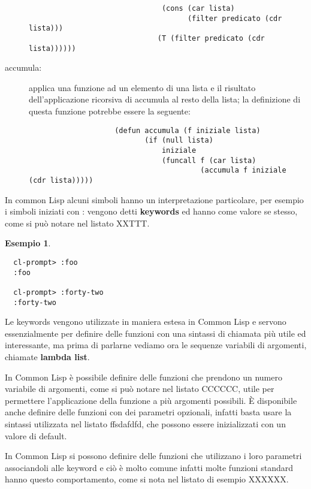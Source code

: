 \documentclass[a4paper]{book}
\newtheorem*{esempio}{Esempio}
\begin{document}
\begin{description}
\begin{verbatim}
                               (cons (car lista)
                                     (filter predicato (cdr lista)))
                              (T (filter predicato (cdr lista))))))
                 \end{verbatim}
  \item [accumula:] applica una funzione ad un elemento di una lista e il risultato
                    dell'applicazione ricorsiva di accumula al resto della lista;
                    la definizione di questa funzione potrebbe essere la seguente:
                    \begin{verbatim}
                    (defun accumula (f iniziale lista)
                           (if (null lista)
                               iniziale
                               (funcall f (car lista)
                                        (accumula f iniziale (cdr lista)))))
                    \end{verbatim}
\end{description}
In common Lisp alcuni simboli hanno un interpretazione particolare, per esempio
i simboli iniziati con : vengono detti \textbf{keywords} ed hanno come valore se stesso,
come si può notare nel listato XXTTT.
\begin{esempio}
  \begin{verbatim}
  cl-prompt> :foo
  :foo

  cl-prompt> :forty-two
  :forty-two
\end{verbatim}
\end{esempio}
Le keywords vengono utilizzate in maniera estesa in Common Lisp e servono essenzialmente
per definire delle funzioni con una sintassi di chiamata più utile ed interessante,
ma prima di parlarne vediamo ora le sequenze variabili di argomenti, chiamate \textbf{lambda list}.

In Common Lisp è possibile definire delle funzioni che prendono un numero variabile di argomenti,
come si può notare nel listato CCCCCC, utile per permettere l'applicazione della funzione
a più argomenti possibili.\newline
È disponibile anche definire delle funzioni con dei parametri opzionali, infatti basta
usare la sintassi utilizzata nel listato ffsdafdfd, che possono essere inizializzati
con un valore di default.

In Common Lisp si possono definire delle funzioni che utilizzano i loro parametri
associandoli alle keyword e ciò è molto comune infatti molte funzioni standard
hanno questo comportamento, come si nota nel listato di esempio XXXXXX.
\end{document}
